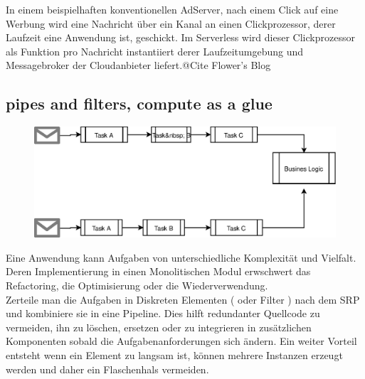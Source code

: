 \documentclass[
12pt,
english,
ngerman,
headsepline,
twoside,
openright,
numbers=noenddot,version=first
]{scrreprt}
\begin{document}
In einem beispielhaften konventionellen AdServer, nach einem Click auf eine Werbung wird eine Nachricht über ein Kanal an einen Clickprozessor, derer Laufzeit eine Anwendung ist, geschickt. Im Serverless wird dieser Clickprozessor als Funktion pro Nachricht instantiiert derer Laufzeitumgebung und Messagebroker der Cloudanbieter liefert.@Cite Flower's Blog


\subsection{pipes and filters, compute as a glue}
\label{sec:pipes-filters}
\begin{figure}
	\includegraphics[width=0.9\linewidth]{./pics/pipes-and-filters.eps}
\end{figure}
Eine Anwendung kann Aufgaben von unterschiedliche Komplexität und Vielfalt. Deren Implementierung in einen Monolitischen Modul erwschwert das Refactoring, die Optimisierung oder die Wiederverwendung. \\
Zerteile man die Aufgaben in Diskreten Elementen ( oder Filter ) nach dem \acrshort{SRP} und kombiniere sie in eine Pipeline. Dies hilft redundanter Quellcode zu vermeiden, ihn zu löschen, ersetzen oder zu integrieren in zusätzlichen Komponenten sobald die Aufgabenanforderungen sich ändern\cite{patternsCloud}. Ein weiter Vorteil entsteht wenn ein Element zu langsam ist, können mehrere Instanzen erzeugt werden und daher ein Flaschenhals vermeiden.
\end{document}
